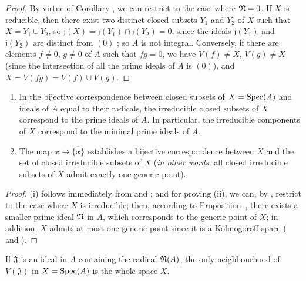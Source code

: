 \begin{proof}
By virtue of Corollary , we can restrict to the case where $\mathfrak{N}=0$.
If $X$ is reducible, then there exist two distinct closed subsets $Y_1$ and $Y_2$ of $X$ such that $X=Y_1\cup Y_2$, so $\mathfrak{j}(X)=\mathfrak{j}(Y_1)\cap\mathfrak{j}(Y_2)=0$, since the ideals $\mathfrak{j}(Y_1)$ and $\mathfrak{j}(Y_2)$ are distinct from $(0)$ ;
so $A$ is not integral.
Conversely, if there are elements $f\neq 0$, $g\neq 0$ of $A$ such that $fg=0$, we have $V(f)\neq X$, $V(g)\neq X$ (since the intersection of all the prime ideals of $A$ is $(0)$), and $X=V(fg)=V(f)\cup V(g)$.
\end{proof}

\begin{corollary}[1.1.14]
\label{I.1.1.14}
\medskip\noindent
\begin{enumerate}
  \item[{\rm(i)}] In the bijective correspondence between closed subsets of $X=\operatorname{Spec}(A)$ and ideals of $A$ equal to their radicals, the irreducible closed subsets of $X$ correspond to the prime ideals of $A$.
    In particular, the irreducible components of $X$ correspond to the minimal prime ideals of $A$.
  \item[{\rm(ii)}] The map $x\mapsto\overline{\{x\}}$ establishes a bijective correspondence between $X$ and the set of closed irreducible subsets of $X$ (\emph{in other words,} all closed irreducible subsets of $X$ admit exactly one generic point).
\end{enumerate}
\end{corollary}

\begin{proof}
(i) follows immediately from  and ;
and for proving (ii), we can, by , restrict to the case where $X$ is irreducible;
then, according to Proposition~, there exists a smaller prime ideal $\mathfrak{N}$ in $A$, which corresponds to the generic point
of $X$;
in addition, $X$ admits at most one generic point since it is a Kolmogoroff space ( and ).
\end{proof}

\begin{proposition}[1.1.15]
\label{I.1.1.15}
If $\mathfrak{J}$ is an ideal in $A$ containing the radical $\mathfrak{N}(A)$, the only
neighbourhood of $V(\mathfrak{J})$ in $X=\operatorname{Spec}(A)$ is the whole space $X$.
\end{proposition}

